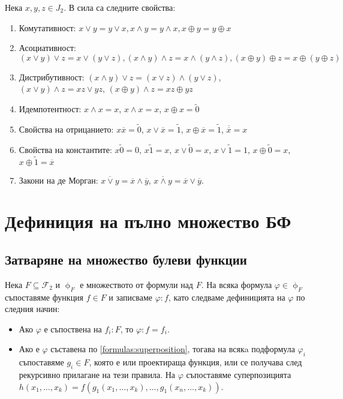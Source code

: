 \documentclass[fleqn,12pt]{article}
\begin{document}
\begin{flushleft}
Нека $x,y,z \in J_2$. В сила са следните свойства:
\begin{enumerate}
    \item Комутативност: $x \vee y = y \vee x, x \wedge y = y \wedge x, x \oplus y = y \oplus x$
    \item Асоциативност: $(x \vee y) \vee z = x \vee (y \vee z), (x \wedge y) \wedge z = x \wedge (y \wedge z), (x \oplus y) \oplus z = x \oplus (y \oplus z)$
    \item Дистрибутивност: $(x \wedge y) \vee z = (x \vee z) \wedge (y \vee z)$, $(x \vee y) \wedge z = xz \vee yz$, $(x \oplus y) \wedge z = xz \oplus yz$
    \item Идемпотентност: $x \wedge x = x$, $x \wedge x = x$, $x \oplus x = \widetilde{0}$
    \item Свойства на отрицанието: $x\overline{x} = \widetilde{0}$, $x \vee \overline{x} = \widetilde{1}$, $x \oplus \overline{x} = \widetilde{1}$, $\overline{\overline{{x}}} = x$
    \item Свойства на константите: $x\widetilde{0} = 0$, $x\widetilde{1} = x$, $x\vee \widetilde{0} = x$, $x \vee \widetilde{1} = 1$, $x \oplus \widetilde{0} = x$, $x \oplus \widetilde{1} = \overline{x}$
    \item Закони на де Морган: $\overline{x \vee y} = \overline{x} \wedge \overline{y}$, $\overline{x \wedge y} = \overline{x} \vee \overline{y}$.  
\end{enumerate}


\section{Дефиниция на пълно множество БФ}
\subsection{Затваряне на множество булеви функции}
Нека $F \subseteq \mathcal{F}_2$ и $\upphi_F$ е множеството от формули над $F$.
На всяка формула $\varphi \in \upphi_F$ съпоставяме функция $f \in F$ и записваме $\varphi : f$, като 
следваме дефиницията на $\varphi$ по следния начин:
\begin{itemize}
    \item Ако $\varphi$ е съпоствена на $f_i : F$, то $\varphi : f = f_i$.
    \item Ако е $\varphi$ съставена по \ref{formulas:superposition}, тогава на всякa подформула $\varphi_i$ съпоставяме $g_i \in F$, 
    която е или проектираща функция, или се получава след рекурсивно прилагане на тези правила. На $\varphi$ съпоставяме 
    суперпозицията $h(x_1, \dots, x_k) = f(g_1(x_1, \dots, x_k), \dots, g_1(x_n, \dots, x_k))$.
\end{itemize}


\end{flushleft}
\end{document}
